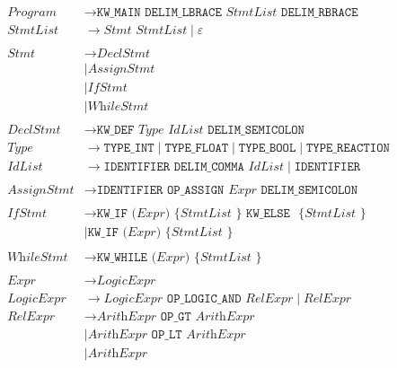 \documentclass[11pt, letterpaper]{article}
\begin{document}
\begin{align*}
\textit{Program} &\to \texttt{KW\_MAIN} \texttt{ DELIM\_LBRACE } \textit{StmtList} \texttt{ DELIM\_RBRACE} \\
\textit{StmtList} &\to \textit{Stmt} \textit{ StmtList} \mid \varepsilon \\
\\
\textit{Stmt} &\to \textit{DeclStmt} \\
&\mid \textit{AssignStmt} \\
&\mid \textit{IfStmt} \\
&\mid \textit{WhileStmt} \\
\\
\textit{DeclStmt} &\to \texttt{KW\_DEF} \textit{ Type} \textit{ IdList} \texttt{ DELIM\_SEMICOLON} \\
\textit{Type} &\to \texttt{TYPE\_INT} \mid \texttt{TYPE\_FLOAT} \mid \texttt{TYPE\_BOOL} \mid \texttt{TYPE\_REACTION} \\
\textit{IdList} &\to \texttt{IDENTIFIER} \texttt{ DELIM\_COMMA } \textit{IdList} \mid \texttt{IDENTIFIER} \\
\\
\textit{AssignStmt} &\to \texttt{IDENTIFIER} \texttt{ OP\_ASSIGN } \textit{Expr} \texttt{ DELIM\_SEMICOLON} \\
\\
\textit{IfStmt} &\to \texttt{KW\_IF} \texttt{ (} \textit{Expr} \texttt{)} \texttt{ \{ } \textit{StmtList} \texttt{ \} } \texttt{ KW\_ELSE } \texttt{ \{ } \textit{StmtList} \texttt{ \} } \\
&\mid \texttt{KW\_IF} \texttt{ (} \textit{Expr} \texttt{)} \texttt{ \{ } \textit{StmtList} \texttt{ \} } \\
\\
\textit{WhileStmt} &\to \texttt{KW\_WHILE} \texttt{ (} \textit{Expr} \texttt{)} \texttt{ \{ } \textit{StmtList} \texttt{ \} } \\
\\
\textit{Expr} &\to \textit{LogicExpr} \\
\textit{LogicExpr} &\to \textit{LogicExpr} \texttt{ OP\_LOGIC\_AND } \textit{RelExpr} \mid \textit{RelExpr} \\
\textit{RelExpr} &\to \textit{ArithExpr} \texttt{ OP\_GT } \textit{ArithExpr} \\
&\mid \textit{ArithExpr} \texttt{ OP\_LT } \textit{ArithExpr} \\
&\mid \textit{ArithExpr} \\

\end{align*}
\end{document}
